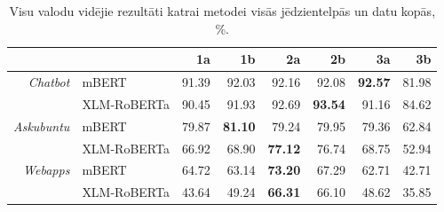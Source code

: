 \begin{table}[htbp]
  \centering
  \caption{Visu valodu vidējie rezultāti katrai metodei visās jēdzientelpās un datu kopās, \%.}
    \begin{tabular}{rlrrrrrr}\toprule
          &       & 1a    & 1b    & 2a    & 2b    & 3a    & 3b \\\midrule
    \textit{Chatbot} & mBERT & 91.39 & 92.03 & 92.16 & 92.08 & \textbf{92.57} & 81.98 \\
          & XLM-RoBERTa & 90.45 & 91.93 & 92.69 & \textbf{93.54} & 91.16 & 84.62 \\\midrule
    \textit{Askubuntu} & mBERT & 79.87 & \textbf{81.10} & 79.24 & 79.95 & 79.36 & 62.84 \\
          & XLM-RoBERTa & 66.92 & 68.90 & \textbf{77.12} & 76.74 & 68.75 & 52.94 \\\midrule
    \textit{Webapps} & mBERT & 64.72 & 63.14 & \textbf{73.20} & 67.29 & 62.71 & 42.71 \\
          & XLM-RoBERTa & 43.64 & 49.24 & \textbf{66.31} & 66.10 & 48.62 & 35.85 \\\bottomrule
    \end{tabular}%
  \label{tab:avg-method}%
\end{table}%